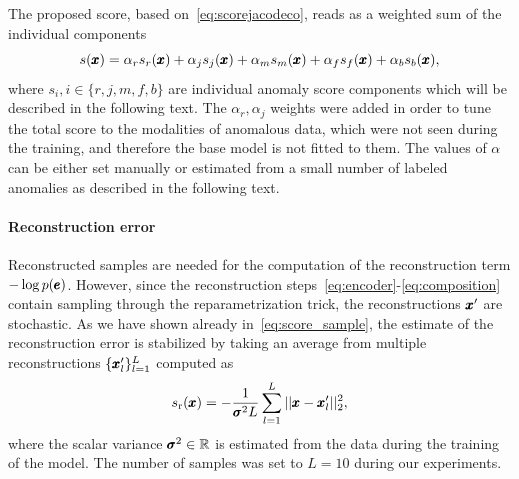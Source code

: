 The proposed score, based on~\eqref{eq:scorejacodeco}, reads as a weighted sum of the individual components
\begin{equation} \label{eq:totalscorejacobian}
    s(\pmb{{x}}) = \alpha_{r}  s_{r}(\pmb{{x}}) + \alpha_j s_j(\pmb{{x}}) + \alpha_m s_{m}(\pmb{{x}}) + \alpha_f s_{f}(\pmb{{x}}) + \alpha_b s_{b}(\pmb{{x}}),
\end{equation}
where $s_i, i \in \{r, j, m, f, b\}$ are individual anomaly score components which will be described in the following text. The $\alpha_r, \alpha_j$ weights were added in order to tune the total score to the modalities of anomalous data, which were not seen during the training, and therefore the base model is not fitted to them. The values of $\alpha$ can be either set manually or estimated from a small number of labeled anomalies as described in the following text.

\paragraph{Reconstruction error}
Reconstructed samples are needed for the computation of the reconstruction term $-\log p(\pmb{{e}})$. However, since the reconstruction steps~\eqref{eq:encoder}-\eqref{eq:composition} contain sampling through the reparametrization trick, the reconstructions $\pmb{{x}}'$ are stochastic. As we have shown already in~\eqref{eq:score_sample}, the estimate of the reconstruction error is stabilized by taking an average from multiple reconstructions $\lbrace \pmb{{x}}'_l \rbrace_{l=1}^L$ computed as
\begin{equation} \label{eq:rsscore}
    s_{\text{r}}(\pmb{{x}}) = - \frac{1}{\pmb{{\sigma}}^2 L}\sum_{l=1}^L \vert \vert \pmb{{x}}-\pmb{{x}}'_l\vert \vert_2^2,
\end{equation}
where the scalar variance $\pmb{{\sigma}}^2 \in \mathbb{R}$ is estimated from the data during the training of the model. The number of samples was set to $L=10$ during our experiments. 

